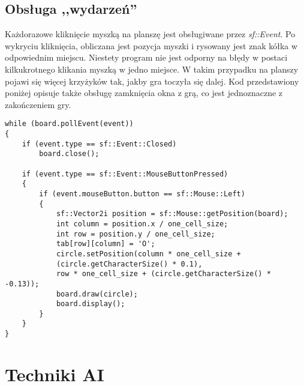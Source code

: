 \documentclass[12pt]{article}
\begin{document}
\subsection{Obsługa ,,wydarzeń''}

Każdorazowe kliknięcie myszką na planszę jest obsługiwane przez \textit{sf::Event}. Po wykryciu kliknięcia, obliczana jest pozycja myszki i rysowany jest znak kółka w odpowiednim miejscu. Niestety program nie jest odporny na błędy w postaci kilkukrotnego klikania myszką w jedno miejsce. W takim przypadku na planszy pojawi się więcej krzyżyków tak, jakby gra toczyła się dalej. Kod przedstawiony poniżej opisuje także obsługę zamknięcia okna z grą, co jest jednoznaczne z zakończeniem gry.

\begin{lstlisting}
while (board.pollEvent(event))
{
    if (event.type == sf::Event::Closed)
        board.close();

    if (event.type == sf::Event::MouseButtonPressed)
    {
        if (event.mouseButton.button == sf::Mouse::Left)
        {
            sf::Vector2i position = sf::Mouse::getPosition(board);
            int column = position.x / one_cell_size;
            int row = position.y / one_cell_size;
            tab[row][column] = 'O';
            circle.setPosition(column * one_cell_size + 
            (circle.getCharacterSize() * 0.1), 
            row * one_cell_size + (circle.getCharacterSize() * -0.13));       
            board.draw(circle);
            board.display();
        }
    }
}

\end{lstlisting}

\section{Techniki AI}
\end{document}
